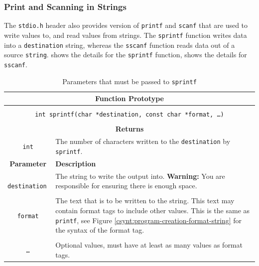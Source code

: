\subsubsection{Print and Scanning in Strings} %
\label{ssub:print_and_scanning_in_strings}

The \texttt{stdio.h} header also provides version of \texttt{printf} and \texttt{scanf} that are used to write values to, and read values from strings. The \texttt{sprintf} function writes data into a \texttt{destination} string, whereas the \texttt{sscanf} function reads data out of a source \texttt{string}.  shows the details for the \texttt{sprintf} function,  shows the details for \texttt{sscanf}.

\begin{table}[h]
  \centering
  \begin{tabular}{|c|p{9cm}|}
    \hline
    \multicolumn{2}{|c|}{\textbf{Function Prototype}} \\
    \hline
    \multicolumn{2}{|c|}{} \\
    \multicolumn{2}{|c|}{\texttt{int sprintf(char *destination, const char *format, \ldots )}} \\
    \multicolumn{2}{|c|}{} \\
    \hline
    \multicolumn{2}{|c|}{\textbf{Returns}} \\
    \hline
    \texttt{int} & The number of characters written to the \texttt{destination} by \texttt{sprintf}. \\
    \hline
    \textbf{Parameter} & \textbf{Description} \\
    \hline
    \texttt{ destination } & The string to write the output into. \textbf{Warning:} You are responsible for ensuring there is enough space.\\
    & \\
    \texttt{ format } & The text that is to be written to the string. This text may contain format tags to include other values. This is the same as \texttt{printf}, see Figure \ref{csynt:program-creation-format-string} for the syntax of the format tag. \\
    & \\
    \texttt{\ldots}   & Optional values, must have at least as many values as format tags. \\
    \hline
  \end{tabular}
  \caption{Parameters that must be passed to \texttt{sprintf}}
  \label{tbl:sprintf}
\end{table}


